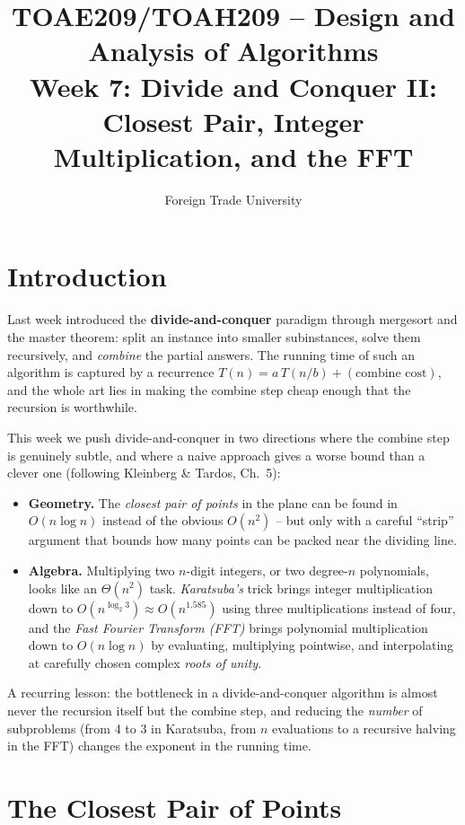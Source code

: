 \documentclass[11pt]{article}
\title{TOAE209/TOAH209 -- Design and Analysis of Algorithms\\[4pt]
\large Week 7: Divide and Conquer II: Closest Pair, Integer Multiplication, and the FFT}
\author{Foreign Trade University}
\date{}
\begin{document}
\maketitle
\tableofcontents

\section{Introduction}

Last week introduced the \textbf{divide-and-conquer} paradigm through mergesort and the
master theorem: split an instance into smaller subinstances, solve them recursively, and
\emph{combine} the partial answers. The running time of such an algorithm is captured by a
recurrence $T(n) = a\,T(n/b) + (\text{combine cost})$, and the whole art lies in making the
combine step cheap enough that the recursion is worthwhile.

This week we push divide-and-conquer in two directions where the combine step is
genuinely subtle, and where a naive approach gives a worse bound than a clever one
(following Kleinberg \& Tardos, Ch.~5):

\begin{itemize}
    \item \textbf{Geometry.} The \emph{closest pair of points} in the plane can be found in
    $O(n \log n)$ instead of the obvious $O(n^2)$ -- but only with a careful ``strip''
    argument that bounds how many points can be packed near the dividing line.
    \item \textbf{Algebra.} Multiplying two $n$-digit integers, or two degree-$n$
    polynomials, looks like an $\Theta(n^2)$ task. \emph{Karatsuba's} trick brings integer
    multiplication down to $O(n^{\log_2 3}) \approx O(n^{1.585})$ using three
    multiplications instead of four, and the \emph{Fast Fourier Transform (FFT)} brings
    polynomial multiplication down to $O(n \log n)$ by evaluating, multiplying pointwise,
    and interpolating at carefully chosen complex \emph{roots of unity}.
\end{itemize}

A recurring lesson: the bottleneck in a divide-and-conquer algorithm is almost never the
recursion itself but the combine step, and reducing the \emph{number} of subproblems (from
4 to 3 in Karatsuba, from $n$ evaluations to a recursive halving in the FFT) changes the
exponent in the running time.

\section{The Closest Pair of Points}
\end{document}
